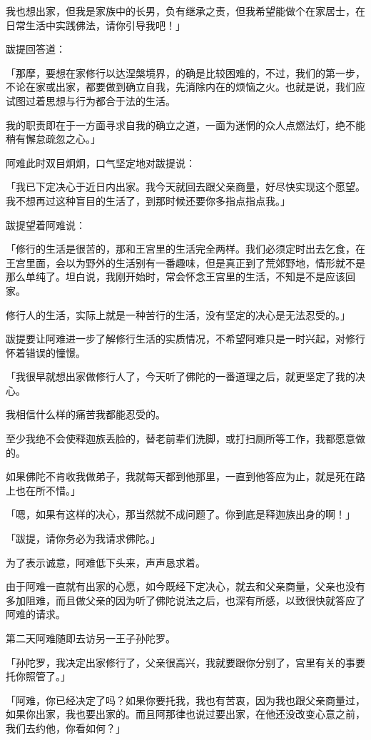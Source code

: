 \documentclass[twoside,openany]{book}
\begin{document}
我也想出家，但我是家族中的长男，负有继承之责，但我希望能做个在家居士，在日常生活中实践佛法，请你引导我吧！」

跋提回答道：

「那摩，要想在家修行以达涅槃境界，的确是比较困难的，不过，我们的第一步，不论在家或出家，都要做到确立自我，先消除内在的烦恼之火。也就是说，我们应试图过着思想与行为都合于法的生活。

我的职责即在于一方面寻求自我的确立之道，一面为迷惘的众人点燃法灯，绝不能稍有懈怠疏忽之心。」

阿难此时双目炯炯，口气坚定地对跋提说：

「我已下定决心于近日内出家。我今天就回去跟父亲商量，好尽快实现这个愿望。我不想再过这种盲目的生活了，到那时候还要你多指点指点我。」

跋提望着阿难说：

「修行的生活是很苦的，那和王宫里的生活完全两样。我们必须定时出去乞食，在王宫里面，会以为野外的生活别有一番趣味，但是真正到了荒郊野地，情形就不是那么单纯了。坦白说，我刚开始时，常会怀念王宫里的生活，不知是不是应该回家。

修行人的生活，实际上就是一种苦行的生活，没有坚定的决心是无法忍受的。」

跋提要让阿难进一步了解修行生活的实质情况，不希望阿难只是一时兴起，对修行怀着错误的憧憬。

「我很早就想出家做修行人了，今天听了佛陀的一番道理之后，就更坚定了我的决心。

我相信什么样的痛苦我都能忍受的。

至少我绝不会使释迦族丢脸的，替老前辈们洗脚，或打扫厕所等工作，我都愿意做的。

如果佛陀不肯收我做弟子，我就每天都到他那里，一直到他答应为止，就是死在路上也在所不惜。」

「嗯，如果有这样的决心，那当然就不成问题了。你到底是释迦族出身的啊！」

「跋提，请你务必为我请求佛陀。」

为了表示诚意，阿难低下头来，声声恳求着。

由于阿难一直就有出家的心愿，如今既经下定决心，就去和父亲商量，父亲也没有多加阻难，而且做父亲的因为听了佛陀说法之后，也深有所感，以致很快就答应了阿难的请求。

第二天阿难随即去访另一王子孙陀罗。

「孙陀罗，我决定出家修行了，父亲很高兴，我就要跟你分别了，宫里有关的事要托你照管了。」

「阿难，你已经决定了吗？如果你要托我，我也有苦衷，因为我也跟父亲商量过，如果你出家，我也要出家的。而且阿那律也说过要出家，在他还没改变心意之前，我们去约他，你看如何？」
\end{document}
